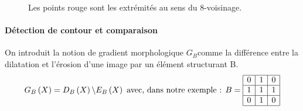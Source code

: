 \documentclass[10pt,a4paper]{article}
\begin{document}
{\begin{figure}[h]
\hspace{-0.0\textwidth}\scalebox{0.66}{}
\vspace{-10mm}
	\caption{Les points rouge sont les extr\'{e}mit\'{e}s au sens du 8-voisinage.}
	\label{wodka}
\end{figure}
\clearpage

\paragraph{D\'{e}tection de contour et comparaison}
On introduit la notion de gradient morphologique $G_B$comme la diff\'{e}rence entre la dilatation et l'\'{e}rosion d'une image par un \'{e}l\'{e}ment structurant B.
\begin{displaymath}
G_B\left(X\right) = D_B\left(X\right)\backslash E_B\left(X\right) \text{ avec, dans notre exemple : }
B = 
\begin{array}{|c|c|c|}
	\hline 0  & 1  & 0   \\
	\hline 1  & 1  & 1  \\
	\hline 0  & 1  & 0  \\
	\hline
\end{array}
\end{displaymath}

}
\end{document}
